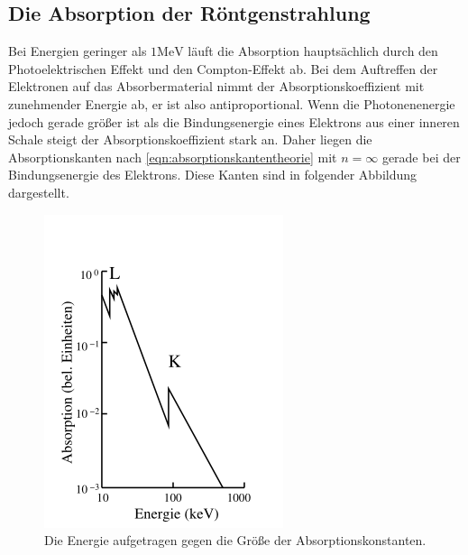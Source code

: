 \subsection{Die Absorption der Röntgenstrahlung}
Bei Energien geringer als $1 \si{\mega\electronvolt}$ läuft die Absorption
hauptsächlich durch den Photoelektrischen Effekt und den Compton-Effekt ab.
Bei dem Auftreffen der Elektronen auf das Absorbermaterial nimmt der
Absorptionskoeffizient mit zunehmender Energie ab, er ist also antiproportional.
Wenn die Photonenenergie jedoch gerade größer ist als die Bindungsenergie eines
Elektrons aus einer inneren Schale steigt der Absorptionskoeffizient stark an.
Daher liegen die Absorptionskanten nach \eqref{eqn:absorptionskantentheorie} mit
$n = \infty$ gerade bei der Bindungsenergie des Elektrons. Diese Kanten sind in
folgender Abbildung dargestellt.
\begin{figure}[H]
  \centering
  \includegraphics[scale=0.5]{"content/absorptionskanten.png"}
  \caption{Die Energie aufgetragen gegen die Größe der Absorptionskonstanten. \cite{AP01}}
  \label{fig:absorptionskanten}
\end{figure}
\noindent

